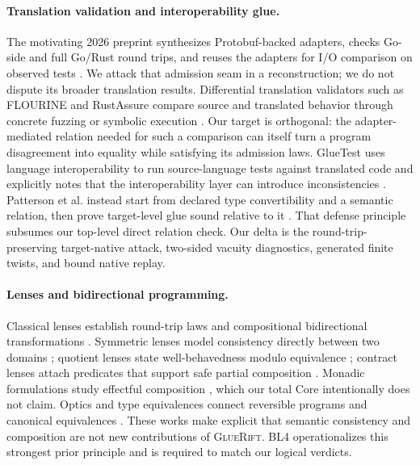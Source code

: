 \documentclass[sigconf,anonymous,review]{acmart}
\newcommand{\sys}{\textsc{GlueRift}\xspace}
\begin{document}
\paragraph{Translation validation and interoperability glue.}
The motivating 2026 preprint synthesizes Protobuf-backed adapters,
checks Go-side and full Go/Rust round trips, and reuses the adapters for
I/O comparison on observed tests \cite{zhang2026validated}.  We attack
that admission seam in a reconstruction; we do not dispute its broader
translation results.  Differential translation validators such as FLOURINE
and RustAssure compare source and translated behavior through concrete
fuzzing or symbolic execution \cite{eniser2024translating,bai2025rustassure}.
Our target is orthogonal: the adapter-mediated relation needed for such a
comparison can itself turn a program disagreement into equality while
satisfying its admission laws.  GlueTest uses language interoperability to run
source-language tests against translated code and explicitly notes
that the interoperability layer can introduce inconsistencies
\cite{abid2024gluetest}.  Patterson et al. instead start from declared
type convertibility and a semantic relation, then prove target-level
glue sound relative to it \cite{patterson2022semantic}.  That defense
principle subsumes our top-level direct relation check.  Our delta is
the round-trip-preserving target-native attack, two-sided vacuity
diagnostics, generated finite twists, and bound native replay.

\paragraph{Lenses and bidirectional programming.}
Classical lenses establish round-trip laws and compositional
bidirectional transformations \cite{foster2007lenses}.  Symmetric
lenses model consistency directly between two domains
\cite{hofmann2011symmetric}; quotient lenses state well-behavedness
modulo equivalence \cite{foster2008quotient}; contract lenses attach
predicates that support safe partial composition
\cite{zhang2023contract}.  Monadic formulations study effectful
composition \cite{xia2019monadic}, which our total Core intentionally
does not claim.  Optics and type equivalences connect reversible
programs and canonical equivalences \cite{carette2019optics}.  These
works make explicit that semantic consistency and composition are not
new contributions of \sys.  BL4 operationalizes this strongest prior
principle and is required to match our logical verdicts.
\end{document}
